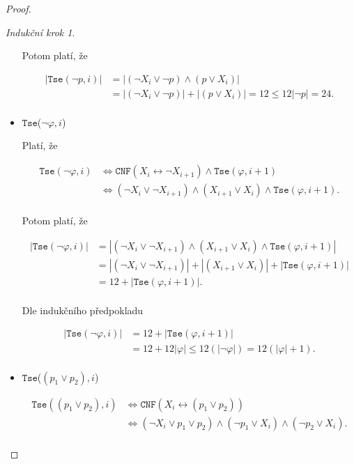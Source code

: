 \documentclass[a4paper, 12pt]{article}
\theoremstyle{definition}
\theoremstyle{definition}
\theoremstyle{definition}
\theoremstyle{remark}
\theoremstyle{remark}
\theoremstyle{remark}
\theoremstyle{remark}
\newtheorem*{inductionstep}{Indukční krok}
\begin{document}
\begin{proof}
\begin{inductionstep}
\begin{itemize}
        \noindent
        Potom platí, že

        \begin{align*}
            |\texttt{Tse}(\neg p, i)| &= |(\neg X_i \lor \neg p) \wedge (p \lor X_i)| \\
            &= |(\neg X_i \lor \neg p)| + |(p \lor X_i)| = 12 \leq 12 |\neg p| = 24. \\
        \end{align*}
        
        \item $\texttt{Tse}$($\neg \varphi, i$)

        Platí, že

        \begin{align*}
            \texttt{Tse}(\neg \varphi, i) &\Longleftrightarrow \texttt{CNF}(X_i \leftrightarrow \neg X_{i+1}) \wedge \texttt{Tse}(\varphi, i + 1) \\
            &\Longleftrightarrow (\neg X_i \lor \neg X_{i+1}) \wedge (X_{i+1} \lor X_i) \wedge \texttt{Tse}(\varphi, i + 1). \\
        \end{align*}

        Potom platí, že
        
        \begin{align*}
            |\texttt{Tse}(\neg \varphi, i)| &= |(\neg X_i \lor \neg X_{i+1}) \wedge (X_{i+1} \lor X_i) \wedge \texttt{Tse}(\varphi, i + 1)| \\
            &= |(\neg X_i \lor \neg X_{i+1})| + |(X_{i+1} \lor X_i)| + |\texttt{Tse}(\varphi, i + 1)| \\
            &= 12 + |\texttt{Tse}(\varphi, i + 1)|.\\
        \end{align*}

        Dle indukčního předpokladu

        \begin{align*}
            |\texttt{Tse}(\neg \varphi, i)| & = 12 + |\texttt{Tse}(\varphi, i + 1)|\\
            &= 12 + 12 |\varphi| \leq 12 (|\neg \varphi|) = 12 (|\varphi| + 1). \\
        \end{align*}

        \item $\texttt{Tse}$($(p_1 \lor p_2), i$)

        \begin{align*}
            \texttt{Tse}((p_1 \lor p_2), i) &\Longleftrightarrow \texttt{CNF}(X_i \leftrightarrow (p_1 \lor p_2)) \\
            &\Longleftrightarrow (\neg X_i \lor p_1 \lor p_2) \wedge (\neg p_1 \lor X_i ) \wedge (\neg p_2 \lor X_i). \\
        \end{align*}


\end{itemize}
\end{inductionstep}
\end{proof}
\end{document}
